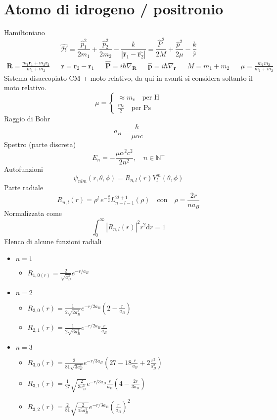 \documentclass{article}
\newcommand{\deh}{\mathrm{d}}
\newcommand{\ham}{\hat{\mathcal{H}}}
\begin{document}
\section{Atomo di idrogeno / positronio}
Hamiltoniano
\[\ham=\frac{\hat{p}_1^2}{2 m_1}+\frac{\hat{p}_2^2}{2m_2}- \frac{k}{|\hat{\mathbf{r}}_1-\hat{\mathbf{r}_2}|}=\frac{\hat{P}^2}{2M}+\frac{\hat{p}^2}{2\mu}-\frac{k}{\hat{r}}\]
\begin{align*}
     \mathbf{R}=\frac{m_1 \mathbf{r}_1 + m_2 \mathbf{r}_2}{m_1+m_2} && \mathbf{r}=\mathbf{r}_2-\mathbf{r}_1 && \hat{\mathbf{P}}=i\hbar\nabla_\mathbf{R} && \hat{\mathbf{p}}=i\hbar\nabla_\mathbf{r} && M = m_1+m_2 && \mu = \frac{m_1 m_2}{m_1+m_2}
\end{align*}
Sistema disaccopiato CM + moto relativo, da qui in avanti si considera soltanto il moto relativo. 
\[\mu=\begin{cases} 
\approx m_e\quad\textrm{per H}\\
\frac{m_e}{2}\quad\textrm{per Ps}
\end{cases}
\]
Raggio di Bohr 
\[a_B=\frac{\hbar}{\mu\alpha c}\]
Spettro (parte discreta)
\[E_n=-\frac{\mu\alpha^2c^2}{2n^2},\quad n\in\mathbb{N}^+\]
Autofunzioni
\[\psi_{nlm}(r,\theta,\phi)=R_{n,l}(r)Y_l^m(\theta,\phi)\]
Parte radiale
\[R_{n,l}(r)=\rho^l\,e^{-\frac{\rho}{2}}L_{n-l-1}^{2l+1}(\rho)\quad\mathrm{con}\quad \rho=\frac{2r}{na_B}\]
Normalizzata come
\[\int_0^{\infty} |R_{n,l}(r)|^2 r^2 \deh r = 1\]
Elenco di alcune funzioni radiali
\begin{itemize}
    \item $n=1$
    \begin{itemize}
        \item[] $R_{1,0(r)}=\frac{2}{\sqrt{a_B^3}}e^{-r/a_B}$
    \end{itemize}
    \item $n=2$
    \begin{itemize}
        \item[] $R_{2,0}(r)=\frac{1}{2\sqrt{2a_B^3}}e^{-r/2a_B}\left(2-\frac{r}{a_B}\right)$
        \item[] $R_{2,1}(r)=\frac{1}{2\sqrt{6a_B^3}}e^{-r/2a_B}\frac{r}{a_B}$
    \end{itemize}
    \item $n=3$
    \begin{itemize}
        \item[] $R_{3,0}(r)=\frac{2}{81\sqrt{3a_B^3}}e^{-r/3a_B}\left(27-18\frac{r}{a_B}+2\frac{r^2}{a_B^2}\right)$
        \item[] $R_{3,1}(r)=\frac{1}{27}\sqrt{\frac{2}{3a_B^3}}e^{-r/3a_B}\frac{r}{a_B}\left(4-\frac{2r}{3a_B}\right)$
        \item[] $R_{3,2}(r)=\frac{2}{81}\sqrt{\frac{2}{15a_B^3}}e^{-r/3a_B}\left(\frac{r}{a_B}\right)^2$
    \end{itemize}
\end{itemize}
\end{document}
